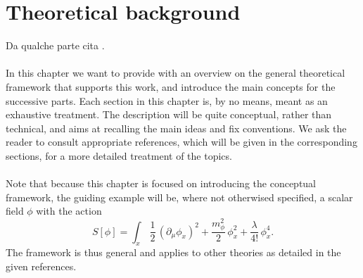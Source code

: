 \chapter{Theoretical background}
\label{chap:background}

Da qualche parte cita \cite{carosso2020novel}. \\~\\
In this chapter we want to provide with an overview on the general theoretical framework that supports this work, and introduce the main concepts for the successive parts. Each section in this chapter is, by no means, meant as an exhaustive treatment. The description will be quite conceptual, rather than technical, and aims at recalling the main ideas and fix conventions. We ask the reader to consult appropriate references,  which will be given in the corresponding sections, for a more detailed treatment of the topics. \\~\\
Note that because this chapter is focused on introducing the conceptual framework, the guiding example will be, where not otherwised specified, a scalar field $\phi$ with the action 
\begin{equation}
    S[\phi] = \int_x \, \frac{1}{2} \, (\partial_\mu \phi_x)^2 + \frac{m_\phi^2}{2} \, \phi_x^2 + \frac{\lambda}{4!} \, \phi_x^4.
    \label{eq:phi4_action}
\end{equation}
The framework is thus general and applies to other theories as detailed in the given references. \\~\\

